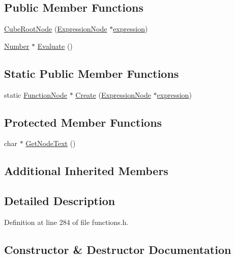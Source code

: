 \subsection*{Public Member Functions}
\begin{DoxyCompactItemize}
\item 
\hyperlink{classCubeRootNode_a07dade3cd376ecd6cff809222234cedb}{Cube\+Root\+Node} (\hyperlink{classExpressionNode}{Expression\+Node} $\ast$\hyperlink{classFunctionNode_ad7577b179a1937aaf8a0058bb5b546dc}{expression})
\item 
\hyperlink{structNumber}{Number} $\ast$ \hyperlink{classCubeRootNode_ac1f62e660cecd6bc3cfca1a2dd9e2dcc}{Evaluate} ()
\end{DoxyCompactItemize}
\subsection*{Static Public Member Functions}
\begin{DoxyCompactItemize}
\item 
static \hyperlink{classFunctionNode}{Function\+Node} $\ast$ \hyperlink{classCubeRootNode_a0daa5b5228c4bf2a2ab64c4e94eb149b}{Create} (\hyperlink{classExpressionNode}{Expression\+Node} $\ast$\hyperlink{classFunctionNode_ad7577b179a1937aaf8a0058bb5b546dc}{expression})
\end{DoxyCompactItemize}
\subsection*{Protected Member Functions}
\begin{DoxyCompactItemize}
\item 
char $\ast$ \hyperlink{classCubeRootNode_a9f7fdffeb143c7101e20fba4dc6a7465}{Get\+Node\+Text} ()
\end{DoxyCompactItemize}
\subsection*{Additional Inherited Members}


\subsection{Detailed Description}


Definition at line 284 of file functions.\+h.



\subsection{Constructor \& Destructor Documentation}
